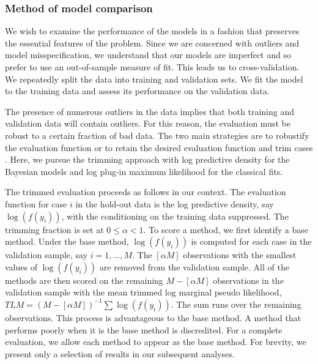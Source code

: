 \documentclass[12pt]{article}
\begin{document}
\subsubsection{Method of model comparison}
We wish to examine the performance of the models in a fashion that preserves the essential features of the 
problem.  Since we are concerned with outliers and model 
misspecification, we understand that our models are imperfect and so prefer to use an out-of-sample measure of fit.  
This leads us to cross-validation.  We repeatedly split the data into training
and validation sets.  We fit the model to the training data and assess its performance on the validation data.  

The presence of numerous outliers in the data implies that both training and validation data will contain 
outliers.  For this reason, the evaluation must be robust to a certain fraction of bad data.  
The two main strategies are to robustify the evaluation function \citep[e.g.,][]{ronchetti1997} or 
to retain the desired evaluation function and trim cases \citep{jung2014}.  Here,
we pursue the trimming approach with log predictive density for the Bayesian models and log plug-in 
maximum likelihood for the classical fits. 

The trimmed evaluation proceeds as follows in our context.  The evaluation function for case $i$ in the hold-out data
is the log predictive density, say
$\log(f(y_i))$, with the conditioning on the training data suppressed.  The trimming 
fraction is set at $0 \leq \alpha < 1$. To score a method,
we first identify a base method.  Under the base method, $\log(f(y_i))$ is computed for each case in the 
validation sample, say $i = 1, \ldots, M$.  The $[\alpha M]$ observations with the smallest values of $\log(f(y_i))$ are 
removed from the validation sample.  All of the methods are then scored on the
remaining $M - [\alpha M]$ observations in the validation sample with the mean trimmed log marginal pseudo likelihood, 
$TLM = (M - [\alpha M])^{-1} \sum \log(f(y_i))$.  
The sum runs over the remaining observations.  This process is advantageous to the base method.  A method
that performs poorly when it is the base method is discredited.  For a complete evaluation, we allow each method
to appear as the base method.  For brevity, we present only a selection of results in our subsequent analyses.  
\end{document}
